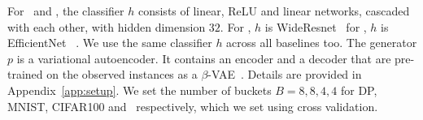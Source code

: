 \documentclass[letterpaper]{article}
\renewcommand{\cite}{\citep}
\begin{document}

 For \dpr\ and \mnist, the classifier $h$ consists of  linear, ReLU  and linear networks, cascaded with each other, with hidden dimension $32$.
For \cifar, $h$ is WideResnet~\cite{zagoruyko2016wide} for \ti, $h$ is EfficientNet ~\cite{tan2021efficientnetv2}. We use the same classifier $h$ across all baselines too.
The generator $p$ is a variational autoencoder. It contains an encoder and a decoder that are pre-trained on the observed instances as a $\beta$-VAE~\cite{higgins2017beta}. Details are provided in Appendix~\ref{app:setup}. We set the number of buckets $B=8,8,4,4$  for DP, MNIST, CIFAR100 and \ti\ respectively, which we set using cross validation.
\end{document}
